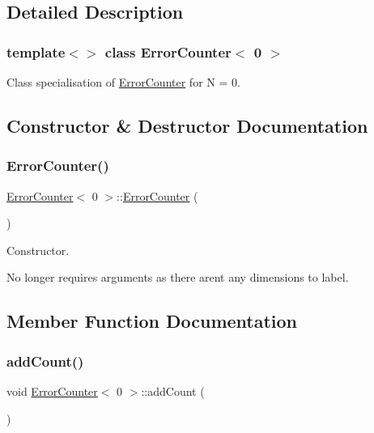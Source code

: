 \subsection{Detailed Description}
\subsubsection*{template$<$$>$\newline
class Error\+Counter$<$ 0 $>$}

Class specialisation of \hyperlink{class_error_counter}{Error\+Counter} for N = 0. 

\subsection{Constructor \& Destructor Documentation}
\mbox{\label{class_error_counter_3_010_01_4_a69313d6eb139dddcb69a66ea412cf6bb}} 
\subsubsection{\texorpdfstring{Error\+Counter()}{ErrorCounter()}}
{\footnotesize\ttfamily \hyperlink{class_error_counter}{Error\+Counter}$<$ 0 $>$\+::\hyperlink{class_error_counter}{Error\+Counter} (\begin{DoxyParamCaption}{ }\end{DoxyParamCaption})\hspace{0.3cm}{\ttfamily [inline]}}



Constructor. 

No longer requires arguments as there aren\textquotesingle{}t any dimensions to label. 

\subsection{Member Function Documentation}
\mbox{\label{class_error_counter_3_010_01_4_a163b6f85e0c41d1af2317787d8a256c2}} 
\subsubsection{\texorpdfstring{add\+Count()}{addCount()}}
{\footnotesize\ttfamily void \hyperlink{class_error_counter}{Error\+Counter}$<$ 0 $>$\+::add\+Count (\begin{DoxyParamCaption}{ }\end{DoxyParamCaption})\hspace{0.3cm}{\ttfamily [inline]}}



